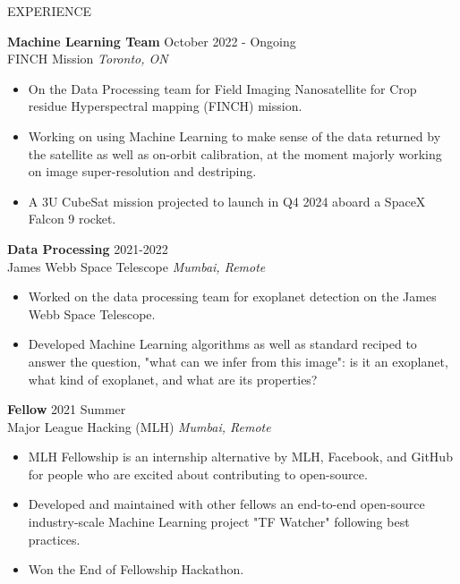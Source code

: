 \documentclass{resume} %
\begin{document}
\begin{rSection}{EXPERIENCE}

\textbf{Machine Learning Team} \hfill October 2022 - Ongoing\\
FINCH Mission \hfill \textit{Toronto, ON}
 \begin{itemize}
    \itemsep -3pt {} 
     \item On the Data Processing team for Field Imaging Nanosatellite for Crop residue Hyperspectral mapping (FINCH) mission.
     \item Working on using Machine Learning to make sense of the data returned by the satellite as well as on-orbit calibration, at the moment majorly working on image super-resolution and destriping.
     \item A 3U CubeSat mission projected to launch in Q4 2024 aboard a SpaceX Falcon 9 rocket.
 \end{itemize}
 
\textbf{Data Processing} \hfill 2021-2022\\
James Webb Space Telescope \hfill \textit{Mumbai, Remote}
 \begin{itemize}
    \itemsep -3pt {} 
     \item Worked on the data processing team for exoplanet detection on the James Webb Space Telescope.
     \item Developed Machine Learning algorithms as well as standard reciped to answer the question, "what can we infer from this image": is it an exoplanet, what kind of exoplanet, and what are its properties?
 \end{itemize}

 \textbf{Fellow} \hfill 2021 Summer\\
Major League Hacking (MLH) \hfill \textit{Mumbai, Remote}
 \begin{itemize}
    \itemsep -3pt {}
     \item MLH Fellowship is an internship alternative by MLH, Facebook, and GitHub for people who are excited about contributing to open-source.
     \item Developed and maintained with other fellows an end-to-end open-source industry-scale Machine Learning project "TF Watcher" following best practices.
    \item Won the End of Fellowship Hackathon.
 \end{itemize}
\end{rSection}
\end{document}
